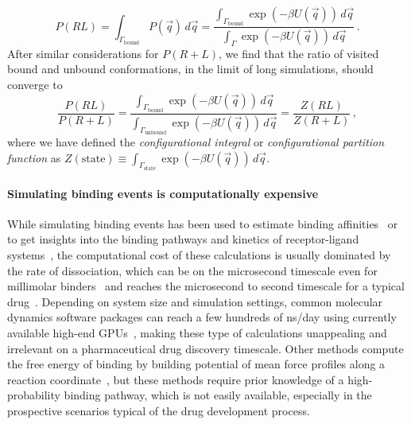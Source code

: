 \documentclass[9pt,bestpractices]{livecoms}
\begin{document}
\begin{equation}
    P(RL) = \int_{\Gamma_{\mathrm{bound}}} P(\vec{q}) \, d\vec{q} = \frac{\int_{\Gamma_{\mathrm{bound}}} \exp\left( -\beta U(\vec{q}) \right) \, d\vec{q}}{\int_{\Gamma} \exp\left( -\beta U(\vec{q}) \right) \, d\vec{q}} \, .
\end{equation}
After similar considerations for $P(R+L)$, we find that the ratio of visited bound and unbound conformations, in the limit of long simulations, should converge to
\begin{equation}\label{eq:bound-unbound-probability-ratio}
    \frac{P(RL)}{P(R+L)} = \frac{\int_{\Gamma_{\mathrm{bound}}} \exp\left( -\beta U(\vec{q}) \right) \, d\vec{q}}{\int_{\Gamma_{\mathrm{unbound}}} \exp\left( -\beta U(\vec{q}) \right) \, d\vec{q}} = \frac{Z(RL)}{Z(R+L)} \, ,
\end{equation}
where we have defined the \textit{configurational integral} or \textit{configurational partition function} as $Z(\mathrm{state}) \equiv \int_{\Gamma_{\mathrm{state}}} \exp\left(-\beta U(\vec{q})\right) \, d\vec{q}$.

\paragraph{Simulating binding events is computationally expensive}
While simulating binding events has been used to estimate binding affinities~\cite{jong2011determining,pan2017quantitative} or to get insights into the binding pathways and kinetics of receptor-ligand systems~\cite{teo2016adaptive,votapka2017seekr,doerr2014onthefly,plattner2015protein,dixon2018predicting}, the computational cost of these calculations is usually dominated by the rate of dissociation, which can be on the microsecond timescale even for millimolar binders~\cite{pan2017quantitative} and reaches the microsecond to second timescale for a typical drug~\cite{basavapathruni2012conformational,hyre2006cooperative}.
Depending on system size and simulation settings, common molecular dynamics software packages can reach a few hundreds of ns/day using currently available high-end GPUs~\cite{eastman2017openmm,kutzner2019more}, making these type of calculations unappealing and irrelevant on a pharmaceutical drug discovery timescale.
Other methods compute the free energy of binding by building potential of mean force profiles along a reaction coordinate~\cite{woo2005calculationa,velez-vega2013overcoming,limongelli2013funnel,heinzelmann2017attachpullrelease}, but these methods require prior knowledge of a high-probability binding pathway, which is not easily available, especially in the prospective scenarios typical of the drug development process.
\end{document}
